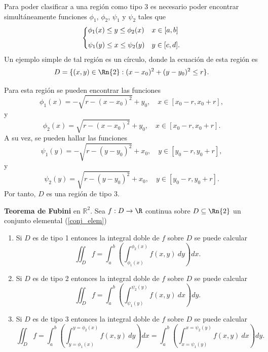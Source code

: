 \begin{example}
    Para poder clasificar a una regi\'on como tipo 3 es necesario poder encontrar simult\'aneamente funciones $\phi_1$, $\phi_2$, $\psi_1$ y $\psi_2$ tales que
    \[
    \begin{dcases}
        \phi_1(x)\leq y\leq\phi_2(x) & x\in[a,b]\\[.2cm]
        \psi_1(y)\leq x\leq\psi_2(y) & y\in[c,d].
    \end{dcases}
    \]
    Un ejemplo simple de tal regi\'on es un c\'irculo, donde la ecuaci\'on de esta regi\'on es $$D=\{(x,y)\in\Rn{2}:(x-x_0)^2+(y-y_0)^2\leq r\}.$$  

    

    Para esta regi\'on se pueden encontrar las funciones
    \[
        \phi_1(x)=-\sqrt{r-(x-x_0)^2}+y_0,\quad x\in[x_0-r,x_0+r],
    \]
    y
    \[
        \phi_2(x)=\sqrt{r-(x-x_0)^2}+y_0,\quad x\in[x_0-r,x_0+r].
    \]
    A su vez, se pueden hallar las funciones
    \[
        \psi_1(y)=-\sqrt{r-(y-y_0)^2}+x_0,\quad y\in[y_0-r,y_0+r],
    \]
    y
    \[
        \psi_2(y)=\sqrt{r-(y-y_0)^2}+x_0,\quad y\in[y_0-r,y_0+r].
    \]
    Por tanto, $D$ es una regi\'on de tipo 3.
\end{example}


\begin{theorem}  \label{col:fubini} \textbf{Teorema de Fubini} en $\mathbb{R}^{2}.$  Sea $f:D\to\R$ continua sobre  $D\subseteq\Rn{2}$  un conjunto elemental   (\ref{conj_elem}) 
   
\begin{enumerate} 
        \item  Si $D$ es de tipo 1   entonces la integral doble de $f$ sobre $D$ se puede calcular
        \[
            \iint_D f=\int_a^b\left(\int_{\phi_1(x)}^{\phi_2(x)}f(x,y)\:dy\right)dx.  
        \]
       
        \item   Si $D$ es de tipo 2   entonces la integral doble de $f$ sobre $D$ se puede calcular
        \[
            \iint_D f=\int_a^b\left(\int_{\psi_1(y)}^{\psi_2(y)}f(x,y)\:dx\right)dy.  
        \]
       
        \item Si $D$ es de tipo 3   entonces la integral doble de $f$ sobre $D$ se puede calcular  
         \[
            \iint_D f=\int_a^b\left(\int_{y=\phi_1(x)}^{y=\phi_2(x)}f(x,y)\:dy\right)dx=\int_a^b\left(\int_{x=\psi_1(y)}^{x=\psi_2(y)}f(x,y)\:dx\right)dy. 
        \]
    \end{enumerate}
\end{theorem}


